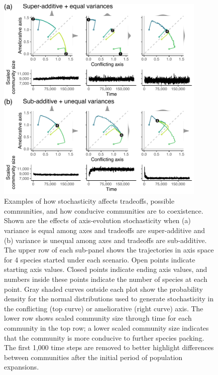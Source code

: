\documentclass[12pt]{article}
\begin{document}
\begin{figure}[ht!]
\centering
\includegraphics[width=0.9\textwidth,keepaspectratio]{5-stoch.pdf}
\caption{Examples of how stochasticity affects tradeoffs, 
possible communities, and how conducive communities are to coexistence.
Shown are the effects of axis-evolution stochasticity when
(a) variance is equal among axes and tradeoffs are super-additive and 
(b) variance is unequal among axes and tradeoffs are sub-additive.
The upper row of each sub-panel shows the trajectories in axis space
for 4 species started under each scenario.
Open points indicate starting axis values.
Closed points indicate ending axis values, and 
numbers inside these points indicate the number of species at each point.
Gray shaded curves outside each plot show the probability density for
the normal distributions used to generate stochasticity in the
conflicting (top curve) or ameliorative (right curve) axis.
The lower row shows scaled community size through time for each community
in the top row;
a lower scaled community size indicates that the community is more 
conducive to further species packing.
The first 1,000 time steps are removed to better highlight differences
between communities after the initial period of population expansions.
}
\label{fig:stochasticity}
\end{figure}



\clearpage

\end{document}
